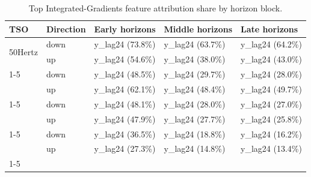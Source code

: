 \begin{table}
\caption{Top Integrated-Gradients feature attribution share by horizon block.}
\begin{tabular}{lllll}
\toprule
TSO & Direction & Early horizons & Middle horizons & Late horizons \\
\midrule
\multirow[t]{2}{*}{50Hertz} & down & y\_lag24 (73.8\%) & y\_lag24 (63.7\%) & y\_lag24 (64.2\%) \\
 & up & y\_lag24 (54.6\%) & y\_lag24 (38.0\%) & y\_lag24 (43.0\%) \\
\cline{1-5}
\multirow[t]{2}{*}{Amprion} & down & y\_lag24 (48.5\%) & y\_lag24 (29.7\%) & y\_lag24 (28.0\%) \\
 & up & y\_lag24 (62.1\%) & y\_lag24 (48.4\%) & y\_lag24 (49.7\%) \\
\cline{1-5}
\multirow[t]{2}{*}{TenneT\_DE} & down & y\_lag24 (48.1\%) & y\_lag24 (28.0\%) & y\_lag24 (27.0\%) \\
 & up & y\_lag24 (47.9\%) & y\_lag24 (27.7\%) & y\_lag24 (25.8\%) \\
\cline{1-5}
\multirow[t]{2}{*}{TransnetBW} & down & y\_lag24 (36.5\%) & y\_lag24 (18.8\%) & y\_lag24 (16.2\%) \\
 & up & y\_lag24 (27.3\%) & y\_lag24 (14.8\%) & y\_lag24 (13.4\%) \\
\cline{1-5}
\bottomrule
\end{tabular}
\end{table}
